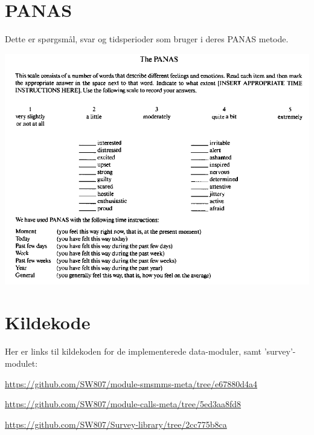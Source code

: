 \appendix

\chapter{PANAS}\label{panas:apppendix}
Dette er spørgsmål, svar og tidsperioder som \citet{panas} bruger i deres PANAS metode.

\includegraphics[width=\textwidth]{graphics/panas}

\chapter{Kildekode}\label{app:kildekode}
Her er links til kildekoden for de implementerede data-moduler, samt 'survey'-modulet:

\begin{description}[style=nextline]
\item[SMS/MMS Meta Data-modul:]
\url{https://github.com/SW807/module-smsmms-meta/tree/e67880d4a4}
\item[Opkald Meta Data-modul:]
\url{https://github.com/SW807/module-calls-meta/tree/5ed3aa8fd8}
\item[Survey Data-modul:]
\url{https://github.com/SW807/Survey-library/tree/2cc775b8ca}
\end{description}
